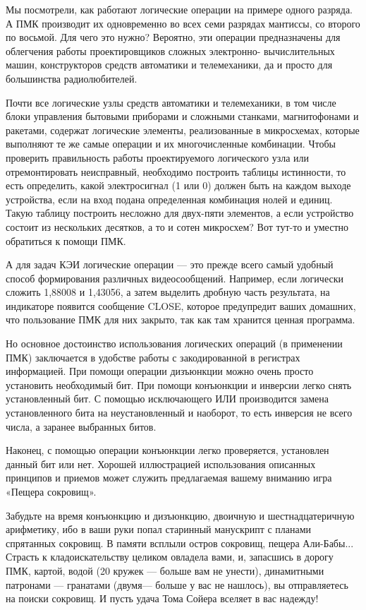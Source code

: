 \documentclass[11pt,a4paper,oneside]{article}
\begin{document}
Мы посмотрели, как работают логические операции на примере одного разряда. А ПМК производит их одновременно во всех семи разрядах мантиссы, со второго по восьмой. Для чего это нужно? Вероятно, эти операции предназначены для облегчения работы проектировщиков сложных электронно- вычислительных машин, конструкторов средств автоматики и телемеханики, да и просто для большинства радиолюбителей.

Почти все логические узлы средств автоматики и телемеханики, в том числе блоки управления бытовыми приборами и сложными станками, магнитофонами и ракетами, содержат логические элементы, реализованные в микросхемах, которые выполняют те же самые операции и их многочисленные комбинации. Чтобы проверить правильность работы проектируемого логического узла или отремонтировать неисправный, необходимо построить таблицы истинности, то есть определить, какой электросигнал (1 или 0) должен быть на каждом выходе устройства, если на вход подана определенная комбинация нолей и единиц. Такую таблицу построить несложно для двух-пяти элементов, а если устройство состоит из нескольких десятков, а то и сотен микросхем? Вот тут-то и уместно обратиться к помощи ПМК.

А для задач КЭИ логические операции — это прежде всего самый удобный способ формирования различных видеосообщений. Например, если логически сложить 1,88008 и 1,43056, а затем выделить дробную часть результата, на индикаторе появится сообщение CLOSE, которое предупредит ваших домашних, что пользование ПМК для них закрыто, так как там хранится ценная программа.

Но основное достоинство использования логических операций (в применении ПМК) заключается в удобстве работы с закодированной в регистрах информацией. При помощи операции дизъюнкции можно очень просто установить необходимый бит. При помощи конъюнкции и инверсии легко снять установленный бит. С помощью исключающего ИЛИ производится замена установленного бита на неустановленный и наоборот, то есть инверсия не всего числа, а заранее выбранных битов.

Наконец, с помощью операции конъюнкции легко проверяется, установлен данный бит или нет. Хорошей иллюстрацией использования описанных принципов и приемов может служить предлагаемая вашему вниманию игра «Пещера сокровищ».

Забудьте на время конъюнкцию и дизъюнкцию, двоичную и шестнадцатеричную арифметику, ибо в ваши руки попал старинный манускрипт с планами спрятанных сокровищ. В памяти всплыли остров сокровищ, пещера Али-Бабы... Страсть к кладоискательству целиком овладела вами, и, запасшись в дорогу ПМК, картой, водой (20 кружек — больше вам не унести), динамитными патронами — гранатами (двумя— больше у вас не нашлось), вы отправляетесь на поиски сокровищ. И пусть удача Тома Сойера вселяет в вас надежду!
\end{document}
